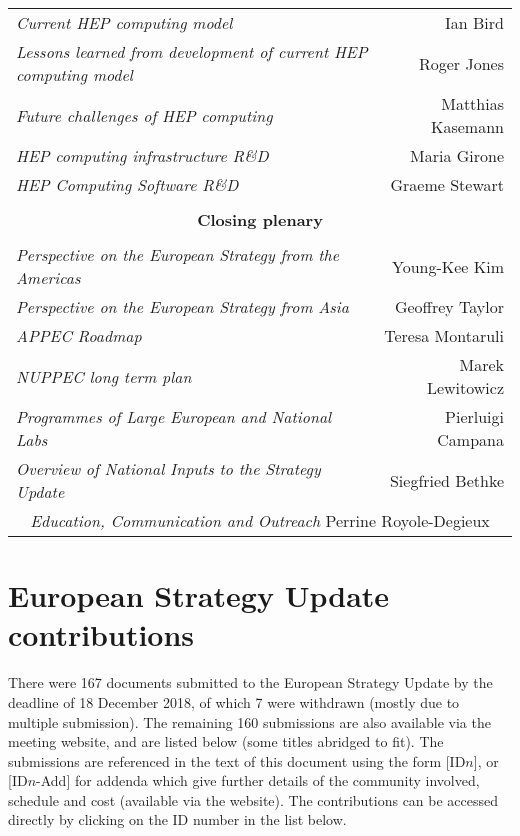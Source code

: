 \begin{flushleft}
\begin{tabular}{lr}
\it Current HEP computing model & Ian Bird \\
\it Lessons learned from development of current HEP computing model & Roger Jones \\
\it Future challenges of HEP computing & Matthias Kasemann \\
\it HEP computing infrastructure R\&D & Maria Girone \\
\it HEP Computing Software R\&D & Graeme Stewart \\ \hline
\vspace*{-3mm} & \\
\multicolumn{2}{c}{\bf Closing plenary} \\
\vspace*{-3mm} & \\
\it Perspective on the European Strategy from the Americas & Young-Kee Kim \\
\it Perspective on the European Strategy from Asia & Geoffrey Taylor \\
\it APPEC Roadmap & Teresa Montaruli \\
\it NUPPEC long term plan & Marek Lewitowicz \\
\it Programmes of Large European and National Labs & Pierluigi Campana \\
\it Overview of National Inputs to the Strategy Update & Siegfried Bethke \\
\multicolumn{2}{c}{{\it Education, Communication and Outreach} \hfill Perrine Royole-Degieux} \\ \hline
\end{tabular}
\end{flushleft}
\newpage
\section{European Strategy Update contributions}
There were 167 documents submitted to the European Strategy Update by the deadline of 18 December 2018, of which 7 were withdrawn (mostly due to multiple submission). The remaining 160 submissions are also available via the meeting website, and are listed below (some titles abridged to fit).  The submissions are referenced in the text of this document using the form [ID$n$], or [ID$n$-Add] for addenda which give further details of the community involved, schedule and cost (available via the website). The contributions can be accessed directly by clicking on the ID number in the list below.

